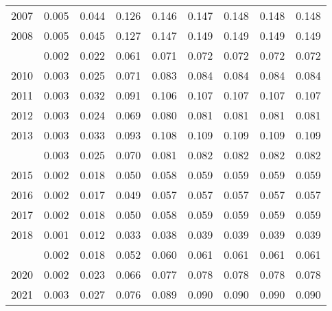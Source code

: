 \documentclass[
]{article}
\begin{document}
\begin{longtable}[t]{lrrrrrrrr}
2007 & 0.005 & 0.044 & 0.126 & 0.146 & 0.147 & 0.148 & 0.148 & 0.148\\
2008 & 0.005 & 0.045 & 0.127 & 0.147 & 0.149 & 0.149 & 0.149 & 0.149\\
\addlinespace
2009 & 0.002 & 0.022 & 0.061 & 0.071 & 0.072 & 0.072 & 0.072 & 0.072\\
2010 & 0.003 & 0.025 & 0.071 & 0.083 & 0.084 & 0.084 & 0.084 & 0.084\\
2011 & 0.003 & 0.032 & 0.091 & 0.106 & 0.107 & 0.107 & 0.107 & 0.107\\
2012 & 0.003 & 0.024 & 0.069 & 0.080 & 0.081 & 0.081 & 0.081 & 0.081\\
2013 & 0.003 & 0.033 & 0.093 & 0.108 & 0.109 & 0.109 & 0.109 & 0.109\\
\addlinespace
2014 & 0.003 & 0.025 & 0.070 & 0.081 & 0.082 & 0.082 & 0.082 & 0.082\\
2015 & 0.002 & 0.018 & 0.050 & 0.058 & 0.059 & 0.059 & 0.059 & 0.059\\
2016 & 0.002 & 0.017 & 0.049 & 0.057 & 0.057 & 0.057 & 0.057 & 0.057\\
2017 & 0.002 & 0.018 & 0.050 & 0.058 & 0.059 & 0.059 & 0.059 & 0.059\\
2018 & 0.001 & 0.012 & 0.033 & 0.038 & 0.039 & 0.039 & 0.039 & 0.039\\
\addlinespace
2019 & 0.002 & 0.018 & 0.052 & 0.060 & 0.061 & 0.061 & 0.061 & 0.061\\
2020 & 0.002 & 0.023 & 0.066 & 0.077 & 0.078 & 0.078 & 0.078 & 0.078\\
2021 & 0.003 & 0.027 & 0.076 & 0.089 & 0.090 & 0.090 & 0.090 & 0.090\\*
\end{longtable}
\end{document}
